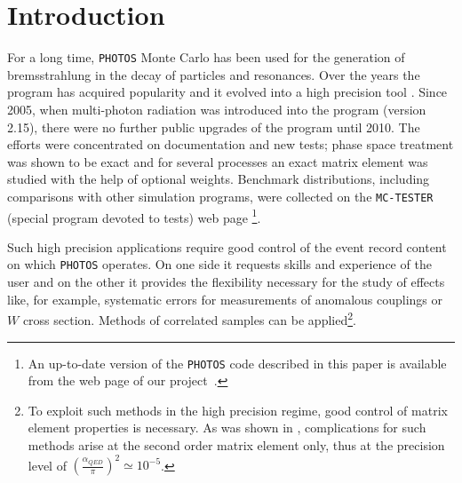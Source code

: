 \documentclass[]{Photos_interface_design}
\begin{document}
\maketitle

\tableofcontents{}

\newpage

\section{Introduction}
For a long time, {\tt PHOTOS} Monte Carlo \cite{Barberio:1990ms,Barberio:1993qi} 
has been used for the generation of bremsstrahlung in the decay of particles and resonances.
Over the years the program has acquired
popularity and it evolved into a high 
precision tool \cite{Golonka:2006tw}. Since 2005, when
multi-photon radiation was 
introduced \cite{Golonka:2005pn} into the program (version 2.15), there were no 
further public upgrades 
of the program until 2010. The efforts were concentrated on documentation and 
new tests;
 phase space treatment was shown to be 
exact \cite{Nanava:2006vv} and for several 
processes \cite{Golonka:2006tw,Nanava:2006vv,Nanava:2009vg}
an exact matrix element was studied with the help of optional weights.
Benchmark distributions, including comparisons with  
other simulation programs, were collected on the {\tt MC-TESTER}~\cite{Davidson:2008ma} (special program devoted to tests) web page \cite{Photos_tests}%
\footnote{An up-to-date version of the {\tt PHOTOS} code described in this paper is
available from the web page of our project~\cite{photosC++}.}. 

 Such high precision applications require good control of the event record content on which {\tt PHOTOS} operates. On one side it 
requests skills and experience of the user and on the other it provides 
the flexibility necessary for the study of effects like, for example, systematic errors for 
measurements of anomalous couplings or $W$ cross section. Methods of 
correlated samples  can be applied\footnote{To exploit such methods in 
the high precision regime, good control of matrix element properties is necessary.
As was shown in \cite{Kleiss:1990jv}, complications for such methods arise at the second order matrix element only, thus at the precision level of 
$(\frac{\alpha_{QED}}{\pi})^2 \simeq 10^{-5}$.}. 
\end{document}

